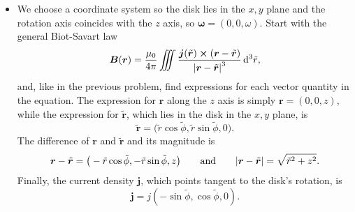 \documentclass[11pt, a4paper]{article}
\newcommand{\diff}{\mathop{}\!\mathrm{d}} %
\newcommand{\eqtext}[1]{\qquad \text{#1} \qquad}
\renewcommand{\vec}[1]{\bm{#1}} %
\newcommand{\tvec}[1]{\tilde{\vec{#1}}} %
\renewcommand{\t}[1]{\tilde{#1}} %
\renewcommand{\r}{\vec{r}}
\newcommand{\B}{\vec{B}}  %
\begin{document}
\begin{itemize}
	\item We choose a coordinate system so the disk lies in the $ x, y $ plane and the rotation axis coincides with the $ z $ axis, so $ \bm{\omega} = (0, 0, \omega) $. Start with the general Biot-Savart law
	\begin{equation*}
		\B (\r) = \frac{\mu_{0}}{4\pi}\iiint \frac{\vec{j}(\tvec{r}) \cross (\r - \tvec{r})}{\abs{\r - \tvec{r}}^{3}} \diff^{3}\tilde{r},
	\end{equation*}
	and, like in the previous problem, find expressions for each vector quantity in the equation. The expression for $ \r $ along the $ z $ axis is simply $ \r = (0, 0, z) $, while the expression for $ \tvec{r} $, which lies in the disk in the $ x, y $ plane, is
	\begin{equation*}
		\tvec{r} = \big(\tilde{r} \cos \tilde{\phi}, \tilde{r} \sin \tilde{\phi}, 0 \big).
	\end{equation*}
	The difference of $ \r $ and $ \tvec{r} $ and its magnitude is
	\begin{equation*}
		\r - \tvec{r} = \big(-\tilde{r} \cos \tilde{\phi}, - \tilde{r} \sin \tilde{\phi}, z \big) \eqtext{and} \abs{\r - \tvec{r}} = \sqrt{\tilde{r}^{2} + z^{2}}.
	\end{equation*}
	Finally, the current density $ \vec{j} $, which points tangent to the disk's rotation, is
	\begin{equation*}
		\vec{j} = j(-\sin \t{\phi}, \cos \t{\phi},0 ).
	\end{equation*}
	

\end{itemize}
\end{document}
